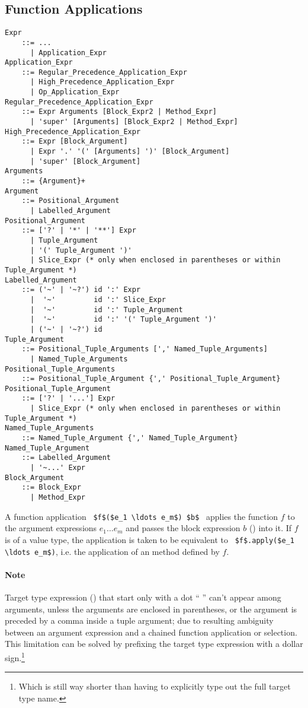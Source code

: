 \subsection{Function Applications}
\label{sec:function-applications}

\grammar\begin{lstlisting}[deletekeywords={no}]
Expr
    ::= ...
      | Application_Expr
Application_Expr 
    ::= Regular_Precedence_Application_Expr 
      | High_Precedence_Application_Expr
      | Op_Application_Expr
Regular_Precedence_Application_Expr
    ::= Expr Arguments [Block_Expr2 | Method_Expr]
      | 'super' [Arguments] [Block_Expr2 | Method_Expr]
High_Precedence_Application_Expr
    ::= Expr [Block_Argument]
      | Expr '.' '(' [Arguments] ')' [Block_Argument]
      | 'super' [Block_Argument]
Arguments
    ::= {Argument}+
Argument
    ::= Positional_Argument
      | Labelled_Argument
Positional_Argument 
    ::= ['?' | '*' | '**'] Expr
      | Tuple_Argument
      | '(' Tuple_Argument ')'
      | Slice_Expr (* only when enclosed in parentheses or within Tuple_Argument *)
Labelled_Argument
    ::= ('~' | '~?') id ':' Expr
      |  '~'         id ':' Slice_Expr
      |  '~'         id ':' Tuple_Argument
      |  '~'         id ':' '(' Tuple_Argument ')'
      | ('~' | '~?') id
Tuple_Argument 
    ::= Positional_Tuple_Arguments [',' Named_Tuple_Arguments]
      | Named_Tuple_Arguments
Positional_Tuple_Arguments 
    ::= Positional_Tuple_Argument {',' Positional_Tuple_Argument}
Positional_Tuple_Argument 
    ::= ['?' | '...'] Expr
      | Slice_Expr (* only when enclosed in parentheses or within Tuple_Argument *)
Named_Tuple_Arguments
    ::= Named_Tuple_Argument {',' Named_Tuple_Argument}
Named_Tuple_Argument
    ::= Labelled_Argument
      | '~...' Expr
Block_Argument
    ::= Block_Expr
      | Method_Expr
\end{lstlisting}

A function application ~\lstinline!$f$($e_1 \ldots e_m$) $b$!~ applies the function $f$ to the argument expressions $e_1 \ldots e_m$ and passes the block expression $b$ () into it. If $f$ is of a value type, the application is taken to be equivalent to ~\lstinline!$f$.apply($e_1 \ldots e_m$)!, i.e. the application of an  method defined by $f$. 

\paragraph{Note}
Target type expression () that start only with a dot ``\,\,'' can't appear among arguments, unless the arguments are enclosed in parentheses, or the argument is preceded by a comma inside a tuple argument; due to resulting ambiguity between an argument expression and a chained function application or selection. This limitation can be solved by prefixing the target type expression with a dollar sign.\footnote{Which is still way shorter than having to explicitly type out the full target type name.}





